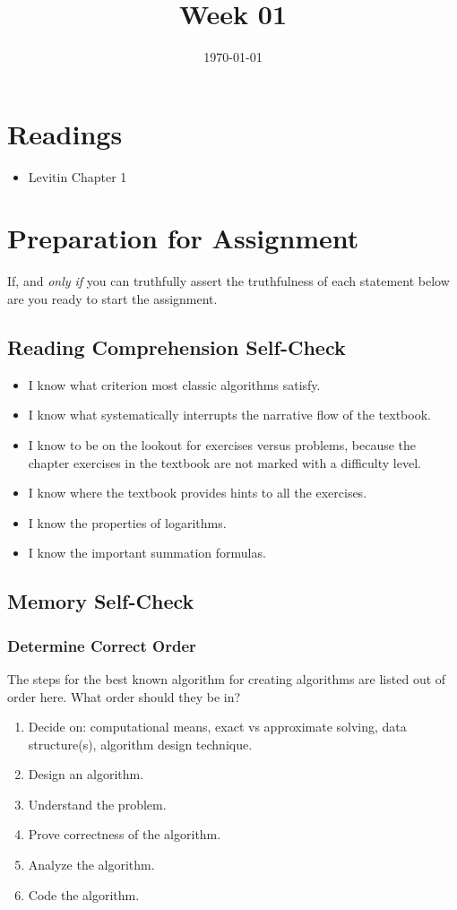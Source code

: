 \documentclass[12pt]{amsart}
\title{Week 01}
\date{\today}
\begin{document}
\maketitle
\section{Readings}
\begin{itemize}
	\item Levitin Chapter 1
\end{itemize}
\section{Preparation for Assignment}
If, and \textit{only if} you can truthfully assert the truthfulness of each statement below are you ready to start the assignment.
\subsection {Reading Comprehension Self-Check}
\begin{itemize}
	\item I know what criterion most classic algorithms satisfy.
	\item I know what systematically interrupts the narrative flow of the textbook.
	\item I know to be on the lookout for exercises versus problems, because the chapter exercises in the textbook are not marked with a difficulty level.
	\item I know where the textbook provides hints to all the exercises.
	\item I know the properties of logarithms.
	\item I know the important summation formulas.
\end{itemize}
\subsection{Memory Self-Check}
\subsubsection{Determine Correct Order}

The steps for the best known algorithm for creating algorithms are listed out of order here. What order should they be in?
\begin{enumerate}
	\item Decide on: computational means, exact vs approximate solving, data structure(s), algorithm
 design technique.
 	\item Design an algorithm.
	\item Understand the problem.
	\item Prove correctness of the algorithm.
	\item Analyze the algorithm.
	\item Code the algorithm.

\end{enumerate}
\end{document}
